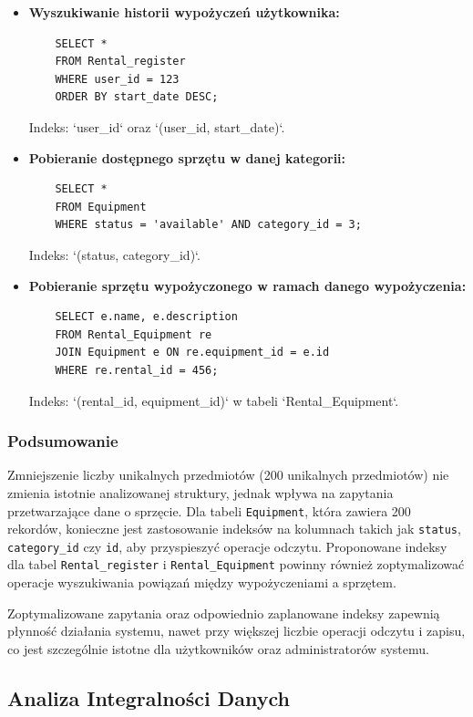 \documentclass{article}
\begin{document}
\begin{itemize}
    \item \textbf{Wyszukiwanie historii wypożyczeń użytkownika:}
    \begin{verbatim}
    SELECT * 
    FROM Rental_register 
    WHERE user_id = 123 
    ORDER BY start_date DESC;
    \end{verbatim}
    Indeks: `user\_id` oraz `(user\_id, start\_date)`.

    \item \textbf{Pobieranie dostępnego sprzętu w danej kategorii:}
    \begin{verbatim}
    SELECT * 
    FROM Equipment 
    WHERE status = 'available' AND category_id = 3;
    \end{verbatim}
    Indeks: `(status, category\_id)`.

    \item \textbf{Pobieranie sprzętu wypożyczonego w ramach danego wypożyczenia:}
    \begin{verbatim}
    SELECT e.name, e.description
    FROM Rental_Equipment re
    JOIN Equipment e ON re.equipment_id = e.id
    WHERE re.rental_id = 456;
    \end{verbatim}
    Indeks: `(rental\_id, equipment\_id)` w tabeli `Rental\_Equipment`.
\end{itemize}

\subsubsection{Podsumowanie}
Zmniejszenie liczby unikalnych przedmiotów (200 unikalnych przedmiotów) nie zmienia istotnie analizowanej struktury, jednak wpływa na zapytania przetwarzające dane o sprzęcie. Dla tabeli \texttt{Equipment}, która zawiera 200 rekordów, konieczne jest zastosowanie indeksów na kolumnach takich jak \texttt{status}, \texttt{category\_id} czy \texttt{id}, aby przyspieszyć operacje odczytu. Proponowane indeksy dla tabel \texttt{Rental\_register} i \texttt{Rental\_Equipment} powinny również zoptymalizować operacje wyszukiwania powiązań między wypożyczeniami a sprzętem.

Zoptymalizowane zapytania oraz odpowiednio zaplanowane indeksy zapewnią płynność działania systemu, nawet przy większej liczbie operacji odczytu i zapisu, co jest szczególnie istotne dla użytkowników oraz administratorów systemu.

\subsection{Analiza Integralności Danych}
\end{document}

